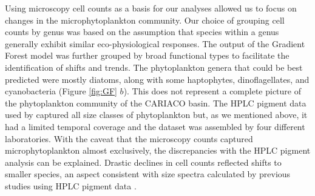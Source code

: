 \documentclass[draft]{agujournal2019}
\begin{document}
    Using microscopy cell counts as a basis for our analyses allowed us to focus on changes in the microphytoplankton community. Our choice of grouping cell counts by genus was based on the assumption that species within a genus generally exhibit similar eco-physiological responses. The output of the Gradient Forest model was further grouped by broad functional types to facilitate the identification of shifts and trends. The phytoplankton genera that could be best predicted were mostly diatoms, along with some haptophytes, dinoflagellates, and cyanobacteria (Figure \ref{fig:GF} $b$). This does not represent a complete picture of the phytoplankton community of the CARIACO basin. The HPLC pigment data used by \citeauthor{pinckney_phytoplankton_2015} captured all size classes of phytoplankton but, as we mentioned above, it had a limited temporal coverage and the dataset was assembled by four different laboratories. With the caveat that the microscopy counts captured microphytoplankton almost exclusively, the discrepancies with the HPLC pigment analysis can be explained. Drastic declines in cell counts reflected shifts to smaller species, an aspect consistent with size spectra calculated by previous studies using HPLC pigment data \cite{lorenzoni_characterization_2015}.
    
\end{document}
